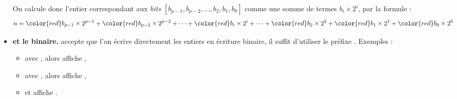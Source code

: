 \documentclass[11pt,class=report,crop=false]{standalone}
\begin{document}
\begin{cours}[Binaire]
\begin{itemize}
On calcule donc l'entier correspondant aux \emph{bits} $[b_{p-1},b_{p-2}, \ldots,b_2,b_1,b_0]$ comme une somme de termes $b_i \times 2^i$, par la formule :
$$n = {\color{red}b_{p-1}} \times 2^{p-1} + {\color{red}b_{p-2}} \times 2^{p-2} + \cdots + {\color{red}b_i} \times 2^i +  \cdots + {\color{red}b_2} \times 2^2 + {\color{red}b_1} \times 2^1 + {\color{red}b_0} \times 2^0$$
  
    \item \textbf{\Python{} et le binaire.} \Python{} accepte que l'on écrive directement les entiers en écriture binaire, il suffit d'utiliser le préfixe \og{}\fg{}.
    Exemples :
    \begin{itemize}
      \item avec , alors  affiche ,
      \item avec , alors  affiche ,
      \item et  affiche .
    \end{itemize} 
 \end{itemize}     

\end{cours}


\end{document}
